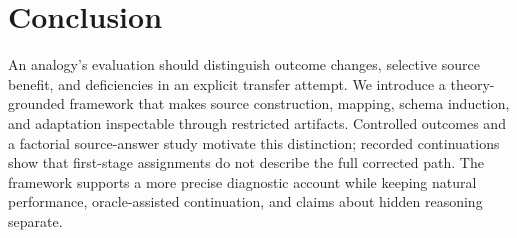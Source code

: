 \section{Conclusion}
An analogy's evaluation should distinguish outcome changes, selective source benefit, and deficiencies in an explicit transfer attempt. We introduce a theory-grounded framework that makes source construction, mapping, schema induction, and adaptation inspectable through restricted artifacts. Controlled outcomes and a factorial source-answer study motivate this distinction; recorded continuations show that first-stage assignments do not describe the full corrected path. The framework supports a more precise diagnostic account while keeping natural performance, oracle-assisted continuation, and claims about hidden reasoning separate.
